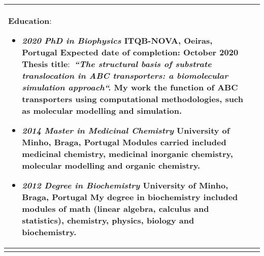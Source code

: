 \documentclass[a4paper,11pt]{article}
\begin{document}
\begin{center}
\begin{tabularx}{\linewidth}{XX}
\toprule[1pt]
\textbf{Education$\colon$}
\begin{itemize}
\item \emph{2020} \textit{\textbf{PhD in Biophysics}}   ITQB-NOVA, Oeiras, Portugal 
\newline
Expected date of completion: October 2020 \newline
Thesis title$\colon$ \emph{``The structural basis of substrate translocation in ABC transporters: a biomolecular simulation approach``.} 
My work  the function of ABC transporters using computational methodologies, such as molecular modelling and simulation.
\item \emph{2014} \textit{\textbf{Master in Medicinal Chemistry}} University of Minho, Braga, Portugal
\newline
Modules carried included medicinal chemistry, medicinal inorganic chemistry, molecular modelling and organic chemistry.
\item \emph{2012}  \textit{\textbf{Degree in Biochemistry}}  University of Minho, Braga, Portugal
\newline
My degree in biochemistry included modules of math (linear algebra, calculus and statistics), chemistry, physics, biology and biochemistry.
\end{itemize} \\
\bottomrule[1pt]
\thispagestyle{empty} 
\end{tabularx}


\end{center}
\end{document}
